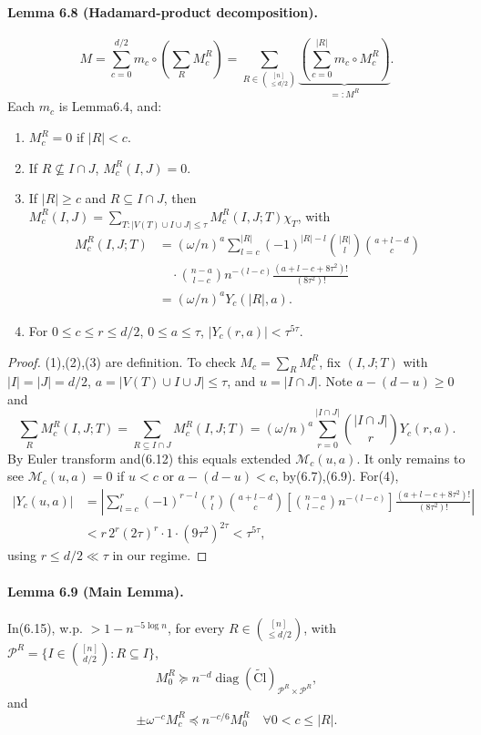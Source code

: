 \documentclass[10pt,a4paper]{article}
\begin{document}
\paragraph{Lemma 6.8 (Hadamard-product decomposition).}
\[M=\sum_{c=0}^{d/2}m_c\circ\left(\sum_RM_c^R\right)=\sum_{R\in\binom{[n]}{\le d/2}}\underbrace{\left(\sum_{c=0}^{|R|}m_c\circ M_c^R\right)}_{=:M^R}.\tag{6.14--6.15}\]
Each $m_c$ is Lemma6.4, and:
\begin{enumerate}\item $M_c^R=0$ if $|R|<c$.
\item If $R\not\subseteq I\cap J$, $M_c^R(I,J)=0$.
\item If $|R|\ge c$ and $R\subseteq I\cap J$, then $M_c^R(I,J)=\sum_{T:|V(T)\cup I\cup J|\le\tau}M_c^R(I,J;T)\chi_T$, with
\begin{align*}M_c^R(I,J;T)&=(\omega/n)^a\sum_{l=c}^{|R|}(-1)^{|R|-l}\binom{|R|}l\binom{a+l-d}c\\&\quad\cdot\binom{n-a}{l-c}n^{-(l-c)}\frac{(a+l-c+8\tau^2)!}{(8\tau^2)!}\\&=(\omega/n)^aY_c(|R|,a).\tag{6.16}\end{align*}
\item For $0\le c\le r\le d/2$, $0\le a\le\tau$, $|Y_c(r,a)|<\tau^{5\tau}$.\end{enumerate}
\begin{proof}(1),(2),(3) are definition. To check $M_c=\sum_RM_c^R$, fix $(I,J;T)$ with $|I|=|J|=d/2$, $a=|V(T)\cup I\cup J|\le\tau$, and $u=|I\cap J|$. Note $a-(d-u)\ge0$ and
\[\sum_RM_c^R(I,J;T)=\sum_{R\subseteq I\cap J}M_c^R(I,J;T)=(\omega/n)^a\sum_{r=0}^{|I\cap J|}\binom{|I\cap J|}rY_c(r,a).\]
By Euler transform and(6.12) this equals extended $\mathcal M_c(u,a)$. It only remains to see $\mathcal M_c(u,a)=0$ if $u<c$ or $a-(d-u)<c$, by(6.7),(6.9). For(4),
\begin{align*}|Y_c(u,a)|&=\left|\sum_{l=c}^r(-1)^{r-l}\binom rl\binom{a+l-d}c\left[\binom{n-a}{l-c}n^{-(l-c)}\right]\frac{(a+l-c+8\tau^2)!}{(8\tau^2)!}\right|\\&<r\,2^r(2\tau)^r\cdot1\cdot(9\tau^2)^{2\tau}<\tau^{5\tau},\end{align*}
using $r\le d/2\ll\tau$ in our regime.\end{proof}
\paragraph{Lemma 6.9 (Main Lemma).} In(6.15), w.p. $>1-n^{-5\log n}$, for every $R\in\binom{[n]}{\le d/2}$, with $\mathcal P^R=\{I\in\binom{[n]}{d/2}:R\subseteq I\}$,
\[M_0^R\succeq n^{-d}\operatorname{diag}(\widetilde{\mathrm{Cl}})_{\mathcal P^R\times\mathcal P^R},\tag{6.17}\]
and
\[\pm\omega^{-c}M_c^R\preceq n^{-c/6}M_0^R\quad\forall0<c\le|R|.\tag{6.18}\]
\end{document}
